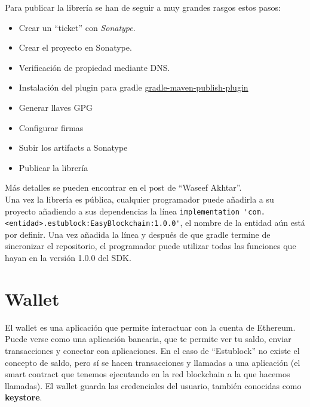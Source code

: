 Para publicar la librería se han de seguir a muy grandes rasgos estos pasos:
\begin{itemize}
\item Crear un ``ticket'' con \emph{Sonatype}\cite{sonatype}.
\item Crear el proyecto en Sonatype.
\item Verificación de propiedad mediante DNS.
\item Instalación del plugin para gradle \href{https://github.com/vanniktech/gradle-maven-publish-plugin}{gradle-maven-publish-plugin}
\item Generar llaves GPG
\item Configurar firmas
\item Subir los artifacts a Sonatype
\item Publicar la librería
\end{itemize}

Más detalles se pueden encontrar en el post de ``Waseef Akhtar''\cite{waseef}. \\

Una vez la librería es pública, cualquier programador puede añadirla a su proyecto añadiendo a sus dependencias la línea \verb|implementation 'com.<entidad>.estublock:EasyBlockchain:1.0.0'|, el nombre de la entidad aún está por definir. Una vez añadida la línea y después de que gradle termine de sincronizar el repositorio, el programador puede utilizar todas las funciones que hayan en la versión 1.0.0 del SDK.


\section{Wallet} \label{sec:wallet}

El wallet es una aplicación que permite interactuar con la cuenta de Ethereum. Puede verse como una aplicación bancaria, que te permite ver tu saldo, enviar transacciones y conectar con aplicaciones. En el caso de ``Estublock'' no existe el concepto de saldo, pero sí se hacen transacciones y llamadas a una aplicación (el smart contract que tenemos ejecutando en la red blockchain a la que hacemos llamadas). El wallet guarda las credenciales del usuario, también conocidas como \textbf{keystore}. \\


